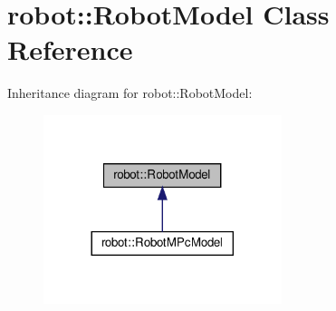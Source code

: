 \hypertarget{classrobot_1_1_robot_model}{}\section{robot\+:\+:Robot\+Model Class Reference}
\label{classrobot_1_1_robot_model}


Inheritance diagram for robot\+:\+:Robot\+Model\+:
\nopagebreak
\begin{figure}[H]
\begin{center}
\leavevmode
\includegraphics[width=197pt]{classrobot_1_1_robot_model__inherit__graph}
\end{center}
\end{figure}

